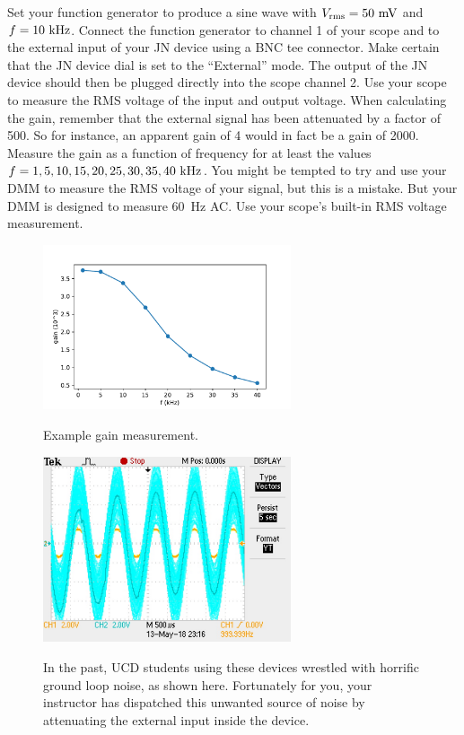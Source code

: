 \documentclass[12pt]{article}
\begin{document}
Set your function generator to produce a sine wave with $V_{\rm rms} = 50~\rm mV$ and $f = 10~\rm kHz$.  Connect the function generator to channel 1 of your scope and to the external input of your JN device using a BNC tee connector.  Make certain that the JN device dial is set to the ``External'' mode.  The output of the JN device should then be plugged directly into the scope channel 2.  Use your scope to measure the RMS voltage of the input and output voltage.  When calculating the gain, remember that the external signal has been attenuated by a factor of 500.  So for instance, an apparent gain of 4 would in fact be a gain of 2000.  Measure the gain as a function of frequency for at least the values $f=1,5,10,15,20,25,30,35,40~\rm kHz$.  You might be tempted to try and use your DMM to measure the RMS voltage of your signal, but this is a mistake.  But your DMM is designed to measure 60~\rm Hz AC.  Use your scope's built-in RMS voltage measurement.

\begin{figure}[htbp]
\begin{center}
{\includegraphics[width=0.65\textwidth]{figs/gain_4.pdf}}
\end{center}
\caption{\label{fig:gain}  Example gain measurement.}
\end{figure}

\begin{figure}[htbp]
\begin{center}
{\includegraphics[width=0.65\textwidth]{figs/gaintrouble.jpg}}
\end{center}
\caption{\label{fig:gaintrouble}  In the past, UCD students using these devices wrestled with horrific ground loop noise, as shown here.  Fortunately for you, your instructor has dispatched this unwanted source of noise by attenuating the external input inside the device.}
\end{figure}
\end{document}
